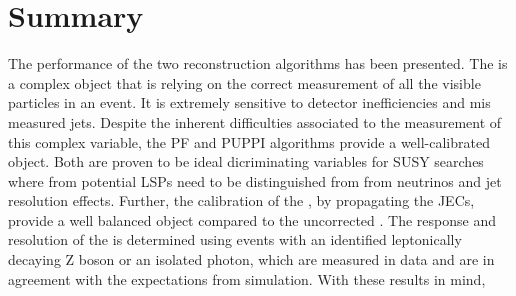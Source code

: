 \section{Summary}
The performance of the two \ptmiss reconstruction algorithms has been presented. 
The \ptmiss is a complex object that is relying on the correct measurement of all the visible particles in an event. 
It is extremely sensitive to detector inefficiencies and mis measured jets. 
Despite the inherent difficulties associated to the measurement of this complex variable, the PF and PUPPI algorithms provide a well-calibrated \ptmiss object.
Both are proven to be ideal dicriminating variables for SUSY searches where \ptmiss from potential LSPs need to be distinguished from \ptmiss from neutrinos and jet resolution effects. 
Further, the calibration of the \ptmiss, by propagating the JECs, provide a well balanced object compared to the uncorrected \ptmiss. 
The response and resolution of the \ptmiss is determined using events with an identified leptonically decaying Z boson or an isolated photon, which are measured in data and are in agreement with the expectations from simulation. 
With these results in mind, 
\clearpage
